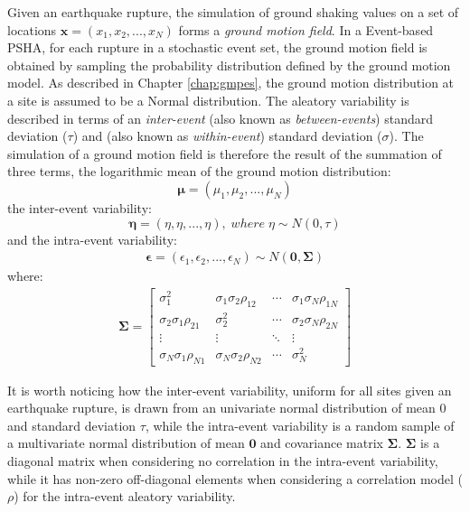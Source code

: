 Given an earthquake rupture, the simulation of ground shaking values on a set of locations $\bm{x}=(x_{1}, x_{2}, ..., x_{N})$
forms a \textit{ground motion field}. In a Event-based PSHA, for each rupture in a stochastic event set,
the ground motion field is obtained by sampling the probability distribution defined by the ground motion model.
As described in Chapter \ref{chap:gmpes}, the ground motion distribution at a site is assumed to be a Normal
distribution. The aleatory variability is described in terms of an \textit{inter-event} (also known as \textit{between-events})
standard deviation ($\tau$) and  (also known as \textit{within-event}) standard deviation ($\sigma$).
The simulation of a ground motion field is therefore the result of the summation of three terms, the logarithmic mean of the
ground motion distribution:
\begin{equation}
\bm\mu = (\mu_{1}, \mu_{2}, ..., \mu_{N})
\end{equation}
the inter-event variability:
\begin{equation}
\bm\eta = (\eta, \eta, ..., \eta),\;where\;\eta\sim N(0, \tau)
\end{equation}
and the intra-event variability:
\begin{align}
\bm\epsilon = (\epsilon_{1}, \epsilon_{2}, ..., \epsilon_{N}) \sim N(\bm{0}, \bm\Sigma)
\end{align}
where:
\begin{align}
\bm\Sigma = 
\begin{bmatrix}
\sigma_{1}^2&\sigma_{1}\sigma_{2}\rho_{12}&\cdots &\sigma_{1}\sigma_{N}\rho_{1N} \\
\sigma_{2}\sigma_{1}\rho_{21}&\sigma_{2}^2&\cdots &\sigma_{2}\sigma_{N}\rho_{2N} \\
\vdots & \vdots & \ddots & \vdots\\
\sigma_{N}\sigma_{1}\rho_{N1}&\sigma_{N}\sigma_{2}\rho_{N2}&\cdots &\sigma_{N}^2
\end{bmatrix}
\end{align}

It is worth noticing how the inter-event variability, uniform for all sites given an earthquake rupture, is drawn
from an univariate normal distribution of mean 0 and standard deviation $\tau$, while the intra-event variability
is a random sample of a multivariate normal distribution of mean $\bm{0}$ and covariance matrix $\bm\Sigma$.
$\bm\Sigma$ is a diagonal matrix when considering no correlation in the intra-event variability, while it has non-zero
off-diagonal elements when considering a correlation model ($\rho$) for the intra-event aleatory variability.


